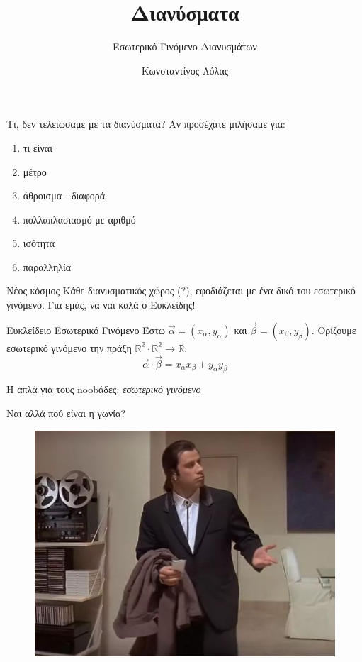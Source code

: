 \documentclass[greek]{beamer}
\title{Διανύσματα}
\subtitle{Εσωτερικό Γινόμενο Διανυσμάτων}
\author[Λόλας]{Κωνσταντίνος Λόλας}
\institute[$10^ο$ ΓΕΛ]{$10^ο$ ΓΕΛ Θεσσαλονίκης}
\date{}
\begin{document}
\begin{frame}
  \titlepage
\end{frame}
\begin{frame}{Τι, δεν τελειώσαμε με τα διανύσματα?}
  Αν προσέχατε μιλήσαμε για:
  \begin{enumerate}
    \item τι είναι
    \item μέτρο
    \item άθροισμα - διαφορά
    \item πολλαπλασιασμό με αριθμό
    \item ισότητα
    \item παραλληλία
  \end{enumerate}
\end{frame}

\begin{frame}{Νέος κόσμος}
  Κάθε διανυσματικός χώρος (?), εφοδιάζεται με ένα δικό του εσωτερικό γινόμενο. Για εμάς, να ναι καλά ο Ευκλείδης!
  \begin{block}{Ευκλείδειο Εσωτερικό Γινόμενο}
    Έστω $\vec{α}=(x_α,y_α)$ και $\vec{β}=(x_β,y_β)$. Ορίζουμε εσωτερικό γινόμενο την πράξη $\mathbb{R^2}\cdot\mathbb{R^2}\to\mathbb{R}$:
    $$\vec{α}\cdot\vec{β}=x_αx_β+y_αy_β$$
  \end{block}
  Ή απλά για τους noobάδες: \emph{εσωτερικό γινόμενο}
\end{frame}

\begin{frame}{Ναι αλλά πού είναι η γωνία?}
  \begin{figure}
    \centering
    \includegraphics[width=0.8 \textwidth]{"../images/missing"}
  \end{figure}
\end{frame}
\end{document}
